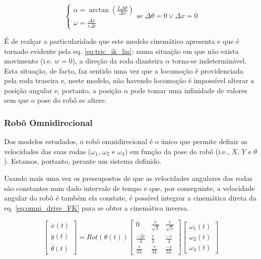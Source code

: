 \documentclass[twocolumn]{article}
\begin{document}
\begin{equation}
    \begin{cases}
        \alpha = \arctan \left( \frac{L \Delta \theta}{\Delta x} \right) \\
        \omega  = \frac{\Delta x}{r \Delta t}
    \end{cases}
    \text{se } \Delta \theta = 0 \vee \Delta x = 0
    \label{eq:tric_ik_lin}
\end{equation}

É de realçar a particularidade que este modelo cinemático apresenta e que é tornado evidente pela eq. \ref{eq:tric_ik_lin}: numa situação em que não exista movimento (i.e. $w = 0$), a direção da roda dianteira $\alpha$ torna-se indeterminável. Esta situação, de facto, faz sentido uma vez que a locomoção é providenciada pela roda traseira e, neste modelo, não havendo locomoção é impossível alterar a posição angular e, portanto, a posição $\alpha$ pode tomar uma infinidade de valores sem que o pose do robô se altere.

\subsubsection{Robô Omnidirecional}

Dos modelos estudados, o robô omnidirecional é o único que permite definir as velocidades das suas rodas ($\omega_1$, $\omega_2$ e $\omega_3$) em função da pose do robô (i.e., $X$, $Y$ e $\theta$). Estamos, portanto, perante um sistema definido.

Usando mais uma vez os pressupostos de que as velocidades angulares das rodas são constantes num dado intervalo de tempo e que, por conseguinte, a velocidade angular do robô é também ela constate, é possível integrar a cinemática direta da eq. \ref{eq:omni_drive_FK} para se obter a cinemática inversa. 

\begin{equation}
    \begin{bmatrix}
        \dot{x}(t) \\
        \dot{y}(t) \\
        \dot{\theta}(t) 
    \end{bmatrix} = 
    Rot(\theta(t))
    \begin{bmatrix}
        0 & \frac{r}{\sqrt{3}} & \frac{r}{\sqrt{3}} \\
        \frac{-2r}{3} & \frac{r}{3} & \frac{-r}{3} \\
        \frac{r}{3L} & \frac{r}{3L} & \frac{-r}{3L}
    \end{bmatrix}
    \begin{bmatrix}
        \omega_1(t) \\
        \omega_2(t) \\
        \omega_3(t) 
    \end{bmatrix}
    \label{eq:omni_drive_FK}
\end{equation}
\end{document}

